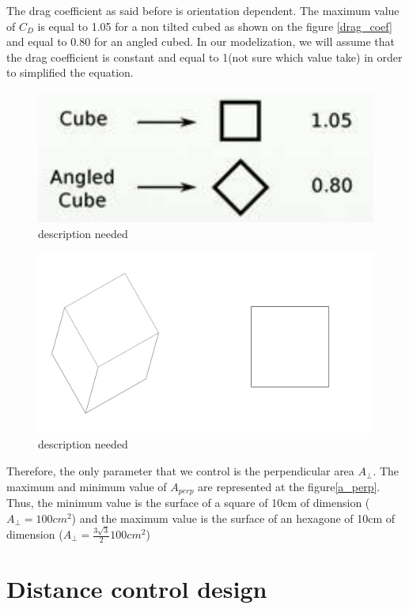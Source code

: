 The drag coefficient as said before is orientation dependent. The maximum value of $C_D$ is equal to 1.05 for a non tilted cubed as shown on the figure \ref{drag_coef} and equal to 0.80 for an angled cubed. In our modelization, we will assume that the drag coefficient is constant and equal to 1(not sure which value take) in order to simplified the equation. \\
\begin{table}[H]
	\begin{minipage}[b]{0.49\linewidth}
		\centering
		\begin{figure}[H]
			\centering
			\includegraphics[width=0.7\linewidth]{figures/drag_coef}
			\caption{description needed}
			\label{fig:des1}
		\end{figure}
	\end{minipage}\hfill
	\begin{minipage}[b]{0.49\linewidth}
		\centering
		\begin{figure}[H]
			\centering
			\includegraphics[width=1\linewidth]{figures/a_prep}
			\caption{description needed}
			\label{fig:des2}
		\end{figure}
	\end{minipage}
\end{table}
Therefore, the only parameter that we control is the perpendicular area $A_{\perp}$. The maximum and minimum value of $A_{perp}$ are represented at the figure\ref{a_perp}. Thus, the minimum value is the surface of a square of 10cm of dimension ($A_{\perp} = 100cm^2$) and the maximum value is the surface of an hexagone of 10cm of dimension ($A_{\perp} = \frac{3\sqrt{3}}{2} 100cm^2$)
%
\chapter{Distance control design}